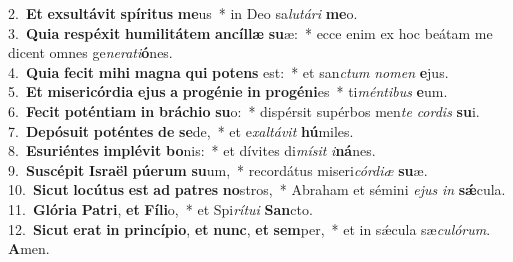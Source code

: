 {2.~}\textbf{Et} \textbf{ex}\textbf{sul}\textbf{tá}\textbf{vit} \textbf{spí}\textbf{ri}\textbf{tus} \textbf{me}us~* in Deo sa\textit{lu}\textit{tá}\textit{ri} \textbf{me}o.\\
{3.~}\textbf{Qui}\textbf{a} \textbf{re}\textbf{spé}\textbf{xit} \textbf{hu}\textbf{mi}\textbf{li}\textbf{tá}\textbf{tem} \textbf{an}\textbf{cíl}\textbf{læ} \textbf{su}æ:~* ecce enim ex hoc beátam me dicent omnes ge\textit{ne}\textit{ra}\textit{ti}\textbf{ó}nes.\\
{4.~}\textbf{Qui}\textbf{a} \textbf{fe}\textbf{cit} \textbf{mi}\textbf{hi} \textbf{ma}\textbf{gna} \textbf{qui} \textbf{po}\textbf{tens} est:~* et san\textit{ctum} \textit{no}\textit{men} \textbf{e}jus.\\
{5.~}\textbf{Et} \textbf{mi}\textbf{se}\textbf{ri}\textbf{cór}\textbf{di}\textbf{a} \textbf{e}\textbf{jus} \textbf{a} \textbf{pro}\textbf{gé}\textbf{ni}\textbf{e} \textbf{in} \textbf{pro}\textbf{gé}\textbf{ni}es~* ti\textit{mén}\textit{ti}\textit{bus} \textbf{e}um.\\
{6.~}\textbf{Fe}\textbf{cit} \textbf{po}\textbf{tén}\textbf{ti}\textbf{am} \textbf{in} \textbf{brá}\textbf{chi}\textbf{o} \textbf{su}o:~* dispérsit supérbos men\textit{te} \textit{cor}\textit{dis} \textbf{su}i.\\
{7.~}\textbf{De}\textbf{pó}\textbf{su}\textbf{it} \textbf{po}\textbf{tén}\textbf{tes} \textbf{de} \textbf{se}de,~* et e\textit{xal}\textit{tá}\textit{vit} \textbf{hú}miles.\\
{8.~}\textbf{E}\textbf{su}\textbf{ri}\textbf{én}\textbf{tes} \textbf{im}\textbf{plé}\textbf{vit} \textbf{bo}nis:~* et dívites di\textit{mí}\textit{sit} \textit{i}\textbf{ná}nes.\\
{9.~}\textbf{Su}\textbf{scé}\textbf{pit} \textbf{Is}\textbf{ra}\textbf{ël} \textbf{pú}\textbf{e}\textbf{rum} \textbf{su}um,~* recordátus miseri\textit{cór}\textit{di}\textit{æ} \textbf{su}æ.\\
{10.~}\textbf{Si}\textbf{cut} \textbf{lo}\textbf{cú}\textbf{tus} \textbf{est} \textbf{ad} \textbf{pa}\textbf{tres} \textbf{no}stros,~* Abraham et sémini \textit{e}\textit{jus} \textit{in} \textbf{sǽ}cula.\\
{11.~}\textbf{Gló}\textbf{ri}\textbf{a} \textbf{Pa}\textbf{tri}, \textbf{et} \textbf{Fí}\textbf{li}o,~* et Spi\textit{rí}\textit{tu}\textit{i} \textbf{San}cto.\\
{12.~}\textbf{Si}\textbf{cut} \textbf{e}\textbf{rat} \textbf{in} \textbf{prin}\textbf{cí}\textbf{pi}\textbf{o}, \textbf{et} \textbf{nunc}, \textbf{et} \textbf{sem}per,~* et in sǽcula sæ\textit{cu}\textit{ló}\textit{rum}. \textbf{A}men.\\
